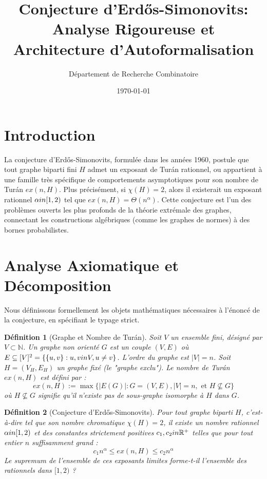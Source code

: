 \documentclass[12pt,a4paper]{article}
\title{Conjecture d'Erdős-Simonovits: Analyse Rigoureuse et Architecture d'Autoformalisation}
\author{Département de Recherche Combinatoire}
\date{\today}
\newtheorem{definition}{Définition}
\begin{document}
\maketitle
\tableofcontents
\newpage

\section{Introduction}

La conjecture d'Erdős-Simonovits, formulée dans les années 1960, postule que tout graphe biparti fini $H$ admet un exposant de Turán rationnel, ou appartient à une famille très spécifique de comportements asymptotiques pour son nombre de Turán $ex(n, H)$. Plus précisément, si $\chi(H) = 2$, alors il existerait un exposant rationnel $\alpha \\in [1, 2)$ tel que $ex(n, H) = \Theta(n^\alpha)$.
Cette conjecture est l'un des problèmes ouverts les plus profonds de la théorie extrémale des graphes, connectant les constructions algébriques (comme les graphes de normes) à des bornes probabilistes.

\section{Analyse Axiomatique et Décomposition}

Nous définissons formellement les objets mathématiques nécessaires à l'énoncé de la conjecture, en spécifiant le typage strict.

\begin{definition}[Graphe et Nombre de Turán]
Soit $V$ un ensemble fini, désigné par $V \subset \mathbb{N}$. Un graphe non orienté $G$ est un couple $(V, E)$ où $E \subseteq [V]^2 = \{ \{u, v\} : u, v \\in V, u \neq v \}$. L'ordre du graphe est $|V| = n$.
Soit $H = (V_H, E_H)$ un graphe fixé (le "graphe exclu"). Le nombre de Turán $ex(n, H)$ est défini par :
$$ ex(n, H) := \max \{ |E(G)| : G = (V, E), |V| = n, \text{ et } H \not\subseteq G \} $$
où $H \not\subseteq G$ signifie qu'il n'existe pas de sous-graphe isomorphe à $H$ dans $G$.
\end{definition}

\begin{definition}[Conjecture d'Erdős-Simonovits]
Pour tout graphe biparti $H$, c'est-à-dire tel que son nombre chromatique $\chi(H) = 2$, il existe un nombre rationnel $\alpha \\in [1, 2)$ et des constantes strictement positives $c_1, c_2 \\in \mathbb{R}^{+}$ telles que pour tout entier $n$ suffisamment grand :
$$ c_1 n^\alpha \leq ex(n, H) \leq c_2 n^\alpha $$
Le supremum de l'ensemble de ces exposants limites forme-t-il l'ensemble des rationnels dans $[1, 2)$ ?
\end{definition}
\end{document}
